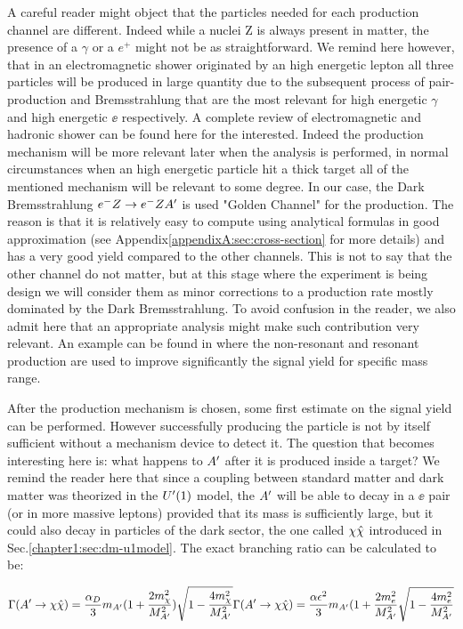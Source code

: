 A careful reader might object that the particles needed for each production channel are different. Indeed while a nuclei Z is always present in matter, the presence of a $\gamma$ or a $e^+$ might not be as straightforward. We remind here however, that in an electromagnetic shower originated by an high energetic lepton all three particles will be produced in large quantity due to the subsequent process of pair-production and Bremsstrahlung that are the most relevant for high energetic $\gamma$ and high energetic $\ee$ respectively. A complete review of electromagnetic and hadronic shower can be found here \cite{Bichsel:2002cf} for the interested. Indeed the production mechanism will be more relevant later when the analysis is performed, in normal circumstances when an high energetic particle hit a thick target all of the mentioned mechanism will be relevant to some degree. In our case, the Dark Bremsstrahlung $e^- Z \to e^- Z A'$ is used "Golden Channel" for the production. The reason is that it is relatively easy to compute using analytical formulas in good approximation (see Appendix\ref{appendixA:sec:cross-section} for more details) and has a very good yield compared to the other channels. This is not to say that the other channel do not matter, but at this stage where the experiment is being design we will consider them as minor corrections to a production rate mostly dominated by the Dark Bremsstrahlung. To avoid confusion in the reader, we also admit here that an appropriate analysis might make such contribution very relevant. An example can be found in \cite{Marsicano_2018} where the non-resonant and resonant production are used to improve significantly the signal yield for specific mass range.

After the production mechanism is chosen, some first estimate on the signal yield can be performed. However successfully producing the particle is not by itself sufficient without a mechanism device to detect it. The question that becomes interesting here is: what happens to $A'$ after it is produced inside a target? We remind the reader here that since a coupling between standard matter and dark matter was theorized in the $U'(1)$ model, the $A'$ will be able to decay in a $\ee$ pair (or in more massive leptons) provided that its mass is sufficiently large, but it could also decay in particles of the dark sector, the one called $\chi \hat{\chi}$ introduced in Sec.\ref{chapter1:sec:dm-u1model}. The exact branching ratio can be calculated to be:

\begin{equation}
  \label{chapter1:eq:dm-bratio}
  \Gamma(A'\rightarrow\dmchi) = \frac{\alpha_D}{3}m_{A'}(1 + \frac{2m^2_{\chi}}{M^2_{A'}})\sqrt{1 - \frac{4m^2_{\chi}}{M^2_{A'}}} \\

  
  \Gamma(A'\rightarrow\dmchi) = \frac{\alpha \epsilon^2}{3}m_{A'}(1 + \frac{2m^2_{e}}{M^2_{A'}}\sqrt{1 - \frac{4m^2_{e}}{M^2_{A'}}} \\
\end{equation}


